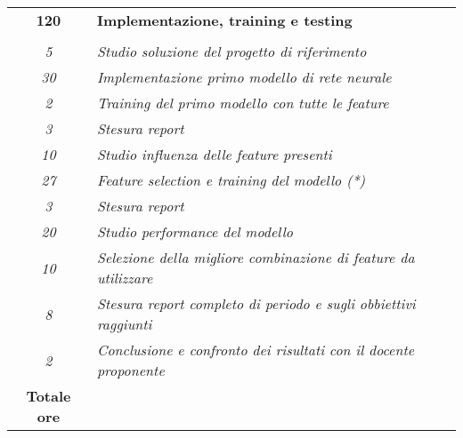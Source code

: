 \begin{tabularx}{\textwidth}{|c|X|}
	\hline
	\hline
	
    \textbf{120} & \textbf{Implementazione, training e testing}  \\ \hdashline 
    \multirow{4}{0cm}\\ 
    \textit{5} & 
    \textit{Studio soluzione del progetto di riferimento} \\
	\textit{30} & 
    \textit{Implementazione primo modello di rete neurale} \\
	\textit{2} & 
    \textit{Training del primo modello con tutte le feature} \\
	\textit{3} & 
    \textit{Stesura report} \\ \hdashline 
    \textit{10} & 
    \textit{Studio influenza delle feature presenti} \\
	\textit{27} & 
    \textit{Feature selection e training del modello (*)} \\
	\textit{3} & 
    \textit{Stesura report} \\ \hdashline 
    \textit{20} & 
    \textit{Studio performance del modello} \\
	\textit{10} & 
    \textit{Selezione della migliore combinazione di feature da utilizzare} \\
	\textit{8} & 
    \textit{Stesura report completo di periodo e sugli obbiettivi raggiunti} \\
	\textit{2} & 
    \textit{Conclusione e confronto dei risultati con il docente proponente} \\
	\hline
	\hline
	
	\textbf{Totale ore} & \multicolumn{1}{|c|}{\textbf{\totaleOre}} \\\hline
	
	
\end{tabularx}